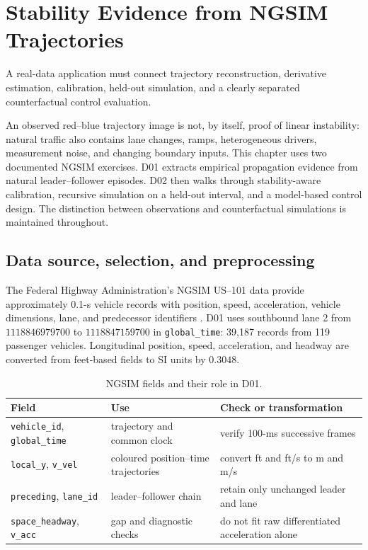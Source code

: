 \documentclass[11pt,a4paper,openany]{book}
\numberwithin{equation}{chapter}
\numberwithin{figure}{chapter}
\numberwithin{table}{chapter}
\newcommand{\chapterguide}[1]{\begin{tcolorbox}[keybox,title=Chapter guide]#1\end{tcolorbox}}
\begin{document}
\chapter{Stability Evidence from NGSIM Trajectories}
\chapterguide{A real-data application must connect trajectory reconstruction, derivative estimation, calibration, held-out simulation, and a clearly separated counterfactual control evaluation.}

An observed red--blue trajectory image is not, by itself, proof of linear instability: natural traffic also contains lane changes, ramps, heterogeneous drivers, measurement noise, and changing boundary inputs. This chapter uses two documented NGSIM exercises. D01 extracts empirical propagation evidence from natural leader--follower episodes. D02 then walks through stability-aware calibration, recursive simulation on a held-out interval, and a model-based control design. The distinction between observations and counterfactual simulations is maintained throughout.

\section{Data source, selection, and preprocessing}
The Federal Highway Administration's NGSIM US--101 data provide approximately 0.1-s vehicle records with position, speed, acceleration, vehicle dimensions, lane, and predecessor identifiers \cite{ngsim}. D01 uses southbound lane 2 from $1118846979700$ to $1118847159700$ in \texttt{global\_time}: 39,187 records from 119 passenger vehicles. Longitudinal position, speed, acceleration, and headway are converted from feet-based fields to SI units by $0.3048$.

\begin{table}[htbp]\centering
\caption{NGSIM fields and their role in D01.}\label{tab:ngsim-fields}
\begin{tabular}{p{3.1cm}p{4.5cm}p{5.3cm}}\toprule
Field & Use & Check or transformation\\\midrule
\texttt{vehicle\_id}, \texttt{global\_time} & trajectory and common clock & verify 100-ms successive frames\\
\texttt{local\_y}, \texttt{v\_vel} & coloured position--time trajectories & convert ft and ft/s to m and m/s\\
\texttt{preceding}, \texttt{lane\_id} & leader--follower chain & retain only unchanged leader and lane\\
\texttt{space\_headway}, \texttt{v\_acc} & gap and diagnostic checks & do not fit raw differentiated acceleration alone\\\bottomrule
\end{tabular}\end{table}
\end{document}
